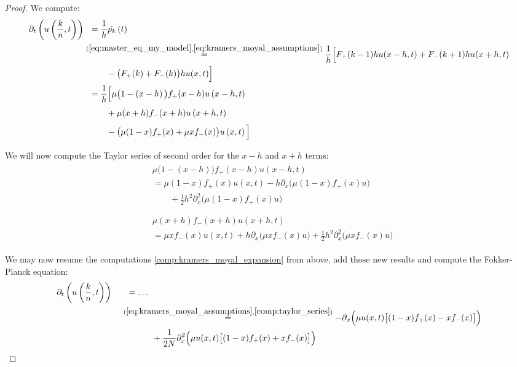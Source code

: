 \documentclass[12pt,a4paper,twoside]{article}
\begin{document}
\begin{proof}
	We compute:
	\begin{align}\label{comp:kramers_moyal_expansion}
	\begin{split}
	\partial_t \left(u\left(\frac{k}{n}, t\right)\right) &\phantom{ll}= \frac{1}{h}\dot{p_k}\left(t\right)\\
	&\overset{(\ref{eq:master_eq_my_model},\ref{eq:kramers_moyal_assumptions})}{=} \frac{1}{h}\Big[F_+(k-1)hu(x-h,t) + F_-(k+1)hu(x+h,t)\Big.\\
	&\qquad\Big. \phantom{ll}- \big(F_+(k)+F_-(k)\big)hu(x,t)\Big]\\
	&\phantom{ll}= \frac{1}{h}\Big[\mu\big(1-\left(x-h\right)\big) f_+(x-h)  u\left(x-h,t \right)\Big.\\
	&\qquad\Big. \phantom{ll}+ \mu(x+h) f_-(x+h) u\left(x+h,t\right)\Big.\\
	&\qquad\Big. \phantom{ll}- \big(\mu(1-x) f_+(x) + \mu x f_-(x)\big) u\left(x,t\right)\Big] 
	\end{split}
	\end{align}
	
	We will now compute the Taylor series of second order for the $x-h$ and $x+h$ terms:
	\begin{align}\label{comp:taylor_series}
	\begin{split}
	&\mu\big(1-(x-h)\big) f_+(x-h)  u\left(x-h,t \right)\\
	&= \mu(1-x)f_+(x) u\left(x,t\right) - h\partial_x \big(\mu(1-x)f_+(x)u\big)\\
	&\qquad +\frac{1}{2}h^2\partial^2_x\big(\mu(1-x)f_+(x)u\big)\\
	&\\
	&\\
	&\mu(x+h) f_-(x+h)  u\left(x+h,t\right)\\
	&= \mu x f_-(x)u(x,t) + h\partial_x \big(\mu x f_-(x) u\big) + \frac{1}{2}h^2\partial^2_x\big(\mu xf_-(x) u\big)
	\end{split}
	\end{align}
	
	We may now resume the computations \eqref{comp:kramers_moyal_expansion} from above, add those new results and compute the Fokker-Planck equation:
	\begin{align*}
	\partial_t \left(u\left(\frac{k}{n}, t\right)\right)\phantom{lll} &\phantom{ll}= \dots \\
	&\overset{(\ref{eq:kramers_moyal_assumptions}, \ref{comp:taylor_series})}{=} -\partial_x\Big(\mu u(x,t)\big[(1-x)f_+(x) - xf_-(x)\big]\Big)\\
	&\qquad\phantom{lllll} + \frac{1}{2N} \partial^2_x\Big(\mu u(x,t)\big[(1-x)f_+(x) + xf_-(x)\big]\Big)\\
	\end{align*}
	

\end{proof}
\end{document}
